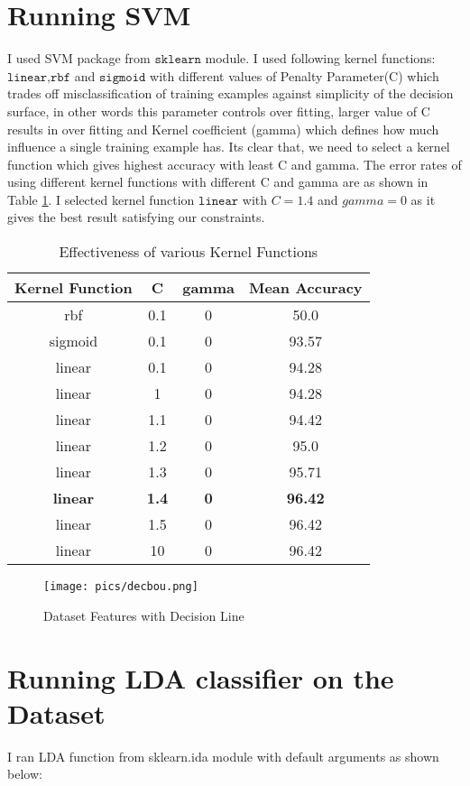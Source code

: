 \documentclass[11pt, pdftex]{article}
\begin{document}
\section{Running SVM}
I used SVM package from $\texttt{sklearn}$ module. I used following kernel functions: $\texttt{linear,rbf}$ and   $\texttt{sigmoid}$ with different values of Penalty Parameter(C) which trades off misclassification of training examples against simplicity of the decision surface, in other words this parameter controls over fitting, larger value of C results in over fitting and Kernel coefficient (gamma) which defines how much influence a single training example has. Its clear that, we need to select a kernel function which gives highest accuracy with least C and gamma. The error rates of using different kernel functions with different C and gamma are as shown in Table \ref{tab:kerf}. I selected kernel function $\texttt{linear}$ with $C = 1.4$ and $gamma = 0$ as it gives the best result satisfying our constraints.
\begin{table}
\centering
\begin{tabular}{ | c | c | c | c |}
    \hline
    {\bf Kernel Function} & {\bf C} & {\bf gamma} & {\bf Mean Accuracy}\\ 
    \hline
    rbf & 0.1 & 0 & 50.0\\
	\hline
	sigmoid & 0.1 & 0 & 93.57\\
	\hline
	linear & 0.1 & 0 & 94.28\\
	\hline
	linear & 1 & 0 & 94.28 \\
	\hline
	linear & 1.1 & 0 & 94.42\\
	\hline
	linear & 1.2 & 0 & 95.0\\
	\hline
	linear & 1.3 & 0 & 95.71\\
	\hline
	{\bf linear} & {\bf 1.4} & {\bf 0} & {\bf 96.42}\\
	\hline
	linear & 1.5 & 0 & 96.42\\
	\hline
	linear & 10 & 0 & 96.42\\
	\hline
	\end{tabular}
	\caption{Effectiveness of various Kernel Functions}
    \label{tab:kerf}
\end{table}

\begin{figure}
    \centering
    \texttt{[image: pics/decbou.png]} 
    \caption{Dataset Features with Decision Line}
    \label{fig:decbou}
\end{figure}

\section{Running LDA classifier on the Dataset}
I ran LDA function from sklearn.ida module with default arguments as shown below:
\end{document}
